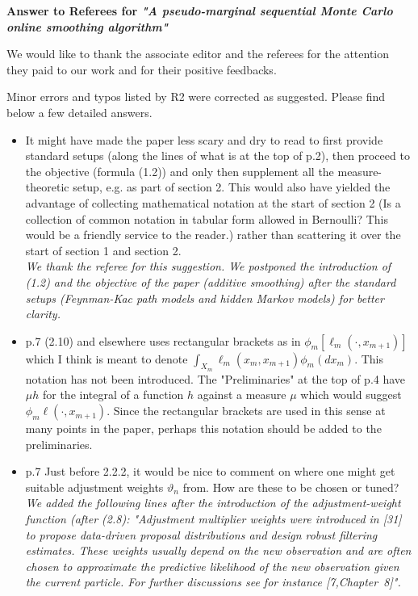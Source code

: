 \documentclass[12pt]{amsart}
\begin{document}
\begin{center}
\textbf{Answer to Referees for \textit{"A pseudo-marginal sequential Monte Carlo online smoothing algorithm"}}
\end{center}

\bigskip

We would like to thank the associate editor and the referees for the attention they paid to our work and for their positive feedbacks. 

\bigskip

Minor errors and typos listed by R2 were corrected as suggested. Please find below a few detailed answers.


\begin{itemize}
\item It might have made the paper less scary and dry to read to first provide standard setups (along the lines of what is at the top of p.2), then proceed to the objective (formula (1.2)) and only then supplement all the measure-theoretic setup, e.g. as part of section 2. This would also have yielded the advantage of collecting mathematical notation at the start of section 2 (Is a collection of common notation in tabular form allowed in Bernoulli? This would be a friendly service to the reader.) rather than scattering it over the start of section 1 and section 2.\\
{\em We thank the referee for this suggestion. We postponed the introduction of (1.2)  and the objective of the paper (additive smoothing) after the standard setups (Feynman-Kac path models and hidden Markov models) for better clarity.}
\item p.7 (2.10) and elsewhere uses rectangular brackets as in $\phi_m[\ell_m(\cdot,x_{m+1})]$ which I think is meant to denote $\int_{X_m}\ell_m(x_m,x_{m+1})\phi_m(dx_m)$. This notation has not been introduced. The "Preliminaries" at the top of p.4 have $\mu h$ for the integral of a function $h$ against a measure $\mu$ which would suggest $\phi_m \ell(\cdot,x_{m+1})$. Since the rectangular brackets are used in this sense at many points in the paper, perhaps this notation should be added to the preliminaries.\\
{\em }
\item p.7 Just before 2.2.2, it would be nice to comment on where one might get suitable adjustment weights $\vartheta_n$ from. How are these to be chosen or tuned?\\
{\em We added the following lines after the introduction of the adjustment-weight function (after (2.8): "Adjustment multiplier weights were introduced in [31] to propose data-driven proposal distributions and design robust filtering estimates. These weights usually depend on the new observation and are often chosen to approximate the predictive likelihood of the new observation given the current particle. For further discussions see for instance [7,Chapter~8]".}

\end{itemize}
\end{document}
